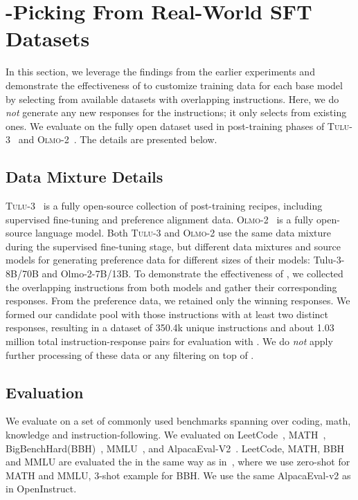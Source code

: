 \section{\name-Picking From Real-World SFT Datasets}
\label{sec:tulu_olmo}
In this section, we leverage the findings from the earlier experiments and demonstrate the effectiveness of \name to customize  training data for each base model by selecting from available datasets with overlapping instructions. 
Here, we do \emph{not} generate any new responses for the instructions; it only selects from existing ones.
We evaluate \name on the fully open dataset used in post-training phases of \textsc{Tulu-3}~\cite{lambert2024tulu3} and \textsc{Olmo-2}~\cite{olmo2025}. The details are presented below. 

\subsection{Data Mixture Details}

\textsc{Tulu-3}~\cite{lambert2024tulu3} is a fully open-source collection of post-training recipes, including supervised fine-tuning and preference alignment data. \textsc{Olmo-2}~\cite{olmo2025} is a fully open-source language model. Both \textsc{Tulu-3} and \textsc{Olmo-2} use the same data mixture during the supervised fine-tuning stage, but different data mixtures and source models for generating preference data for different sizes of their models: Tulu-3-8B/70B and Olmo-2-7B/13B. 
To demonstrate the effectiveness of \name, we collected the overlapping instructions from both models and gather their corresponding responses.
From the preference data, we retained only the winning responses. We formed our candidate pool with those instructions with at least two distinct responses, resulting in a dataset of 350.4k unique instructions and about 1.03 million total instruction-response pairs for evaluation with \name.
We do \emph{not} apply further processing of these data or any filtering on top of  \name.
\subsection{Evaluation}

We evaluate on a set of commonly used benchmarks spanning over coding, math, knowledge and instruction-following. We evaluated on LeetCode~\cite{guo2024deepseekcoder}, MATH~\cite{hendrycks2021measuringmathematicalproblemsolving}, BigBenchHard(BBH)~\cite{suzgun2022bbh}, MMLU~\cite{hendrycks2021mmlu}, and AlpacaEval-V2~\cite{dubois2024alpacaevalv2}. LeetCode, MATH, BBH and MMLU are evaluated the in the same way as in~\cite{yuan2024eurus}, where we use zero-shot for MATH and MMLU, 3-shot example for BBH. We use the same AlpacaEval-v2 as in OpenInstruct.  
